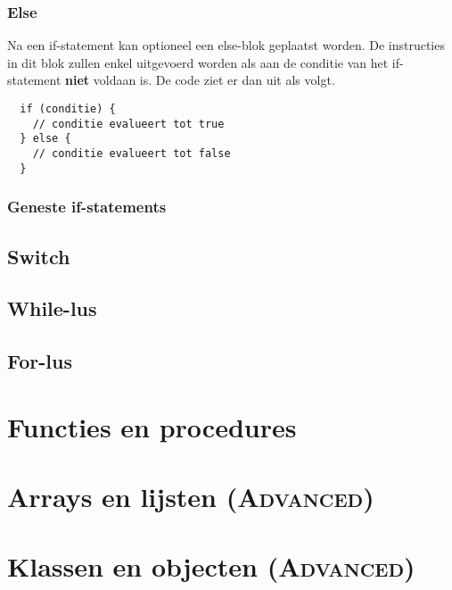 \documentclass[11pt,fleqn]{book} %
\begin{document}
\subsection{Else}
Na een if-statement kan optioneel een else-blok geplaatst worden. De instructies in dit blok zullen enkel uitgevoerd worden als aan de conditie van het if-statement \textbf{niet} voldaan is. De code ziet er dan uit als volgt.

\begin{definition}
	\phantom{ }
	\begin{verbatim}
  if (conditie) {
    // conditie evalueert tot true
  } else {
    // conditie evalueert tot false
  }
	\end{verbatim}
\end{definition}

\subsection{Geneste if-statements}

\section{Switch}

\section{While-lus}

\section{For-lus}


\chapter{Functies en procedures}
\chapter{Arrays en lijsten \textsc{\footnotesize(Advanced)}}
\chapter{Klassen en objecten \textsc{\footnotesize(Advanced)}}
\end{document}
